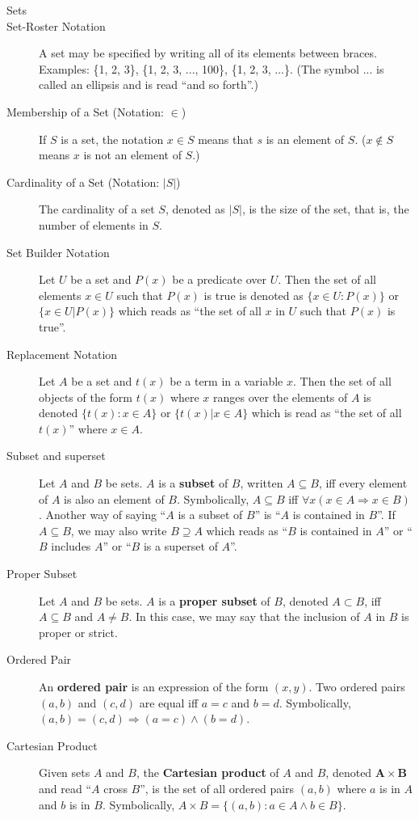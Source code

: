 \documentclass{article}
\begin{document}
\begin{description}
	\vspace{0.2cm}
    \item[\large Sets]
    \item[Set-Roster Notation] A set may be specified by writing all of its elements between braces. Examples: \{1, 2, 3\}, \{1, 2, 3, ..., 100\}, \{1, 2, 3, ...\}. (The symbol ... is called an ellipsis and is read “and so forth”.)
    \item[Membership of a Set (Notation: $\in$)]If $S$ is a set, the notation $x\in S$ means that $s$ is an element of $S$. ($x\not\in S$ means $x$ is not an element of $S$.)
    \item[Cardinality of a Set (Notation: $|S|$)]The cardinality of a set $S$, denoted as $|S|$, is the size of the set, that is, the number of elements in $S$.
    \item[Set Builder Notation]Let $U$ be a set and $P(x)$ be a predicate over $U$. Then  the set of all elements $x\in U$ such that $P(x)$ is true is denoted as $\{x\in U:P(x)\}$ or $\{x\in U|P(x)\}$ which reads as ``the set of all $x$ in $U$ such that $P(x)$ is true''. 
    \item[Replacement Notation]Let $A$ be a set and $t(x)$ be a term in a variable $x$. Then the set of all objects of the form $t(x)$ where $x$ ranges over the elements of $A$ is denoted $\{t(x):x\in A\}$ or $\{t(x)|x\in A\}$ which is read as ``the set of all $t(x)$'' where $x\in A$. 
    \item[Subset and superset]Let $A$ and $B$ be sets. $A$ is a \textbf{subset} of $B$, written $A\subseteq B$, iff every element of $A$ is also an element of $B$. Symbolically, $A\subseteq B$ iff $\forall x(x\in A\Rightarrow x\in B)$. Another way of saying ``$A$ is a subset of $B$'' is ``$A$ is contained in $B$''. If $A\subseteq B$, we may also write $B\supseteq A$ which reads as 	``$B$ is contained in $A$'' or ``$B$ includes $A$'' or ``$B$ is a superset of $A$''. 
    \item[Proper Subset]Let $A$ and $B$ be sets. $A$ is a \textbf{proper subset} of $B$, denoted $A \subset B$, iff $A\subseteq B$ and $A\neq B$. In this case, we may say that the inclusion of $A$ in $B$ is proper or strict.
    \item[Ordered Pair]An \textbf{ordered pair} is an expression of the form $(x, y)$. Two ordered pairs $(a, b)$ and $(c,d)$ are equal iff $a=c$ and $b=d$. Symbolically, $(a,b)=(c,d) \Rightarrow (a=c)\land (b=d)$.
    \item[Cartesian Product]Given sets $A$ and $B$, the \textbf{Cartesian product} of $A$ and $B$, denoted $\mathbf{A}\times \mathbf{B}$ and read ``$A$ cross $B$'', is the set of all ordered pairs $(a, b)$ where $a$ is in $A$ and $b$ is in $B$. Symbolically, $A\times B=\{(a,b):a\in A\land b\in B\}$.    

\end{description}
\end{document}
